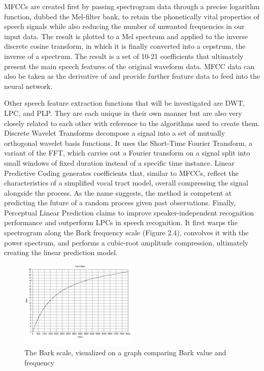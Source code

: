 MFCCs are created first by passing spectrogram data through a precise logarithm function, dubbed the Mel-filter bank, to retain the phonetically vital properties of speech signals while also reducing the number of unwanted frequencies in our input data. The result is plotted to a Mel spectrum and applied to the inverse discrete cosine transform, in which it is finally converted into a cepstrum, the inverse of a spectrum. The result is a set of 10-21 coefficients that ultimately present the main speech features of the original waveform data. MFCC data can also be taken as the derivative of and provide further feature data to feed into the neural network.
\newline\par
Other speech feature extraction functions that will be investigated are DWT, LPC, and PLP. They are each unique in their own manner but are also very closely related to each other with reference to the algorithms used to create them. Discrete Wavelet Transforms decompose a signal into a set of mutually orthogonal wavelet basis functions. It uses the Short-Time Fourier Transform, a variant of the FFT, which carries out a Fourier transform on a signal split into small windows of fixed duration instead of a specific time instance. Linear Predictive Coding generates coefficients that, similar to MFCCs, reflect the characteristics of a simplified vocal tract model, overall compressing the signal alongside the process. As the name suggests, the method is competent at predicting the future of a random process given past observations. Finally, Perceptual Linear Prediction claims to improve speaker-independent recognition performance and outperform LPCs in speech recognition. It first warps the spectrogram along the Bark frequency scale (Figure 2.4), convolves it with the power spectrum, and performs a cubic-root amplitude compression, ultimately creating the linear prediction model.

\begin{figure}[th]
    \centering
    \includegraphics[width=0.5\textwidth]{Figures/barkscale.png}
    \decoRule
    \caption[Bark Scale]{The Bark scale, visualized on a graph comparing Bark value and frequency}
    \label{fig:BarkScale}
\end{figure}